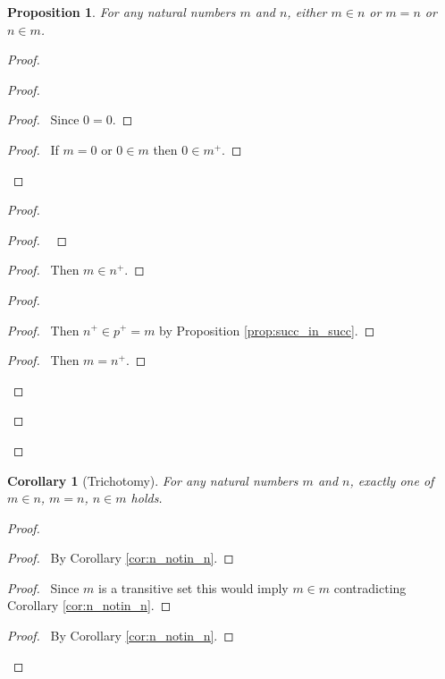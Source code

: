 \documentclass{report}
\let\qed\relax
\newtheorem{prop}[ax]{Proposition}
\newtheorem{cor}{Corollary}[ax]
\theoremstyle{definition}
\begin{document}
\begin{prop}
For any natural numbers $m$ and $n$, either $m \in n$ or $m = n$ or $n \in m$.
\end{prop}

\begin{proof}
\pf
{}
\begin{proof}
	\begin{proof}
		\pf\ Since $0=0$.
	\end{proof}
	\begin{proof}
		\pf\ If $m = 0$ or $0 \in m$ then $0 \in m^+$.
	\end{proof}
\end{proof}
\begin{proof}
	\begin{proof}
		\pf\ 
	\end{proof}
	\begin{proof}
		\pf\ Then $m \in n^+$.
	\end{proof}
	\begin{proof}
		\begin{proof}
			\pf\ Then $n^+ \in p^+ = m$ by Proposition \ref{prop:succ_in_succ}.
		\end{proof}
		\begin{proof}
			\pf\ Then $m = n^+$.
		\end{proof}
	\end{proof}
\end{proof}
\qed
\end{proof}

\begin{cor}[Trichotomy]
For any natural numbers $m$ and $n$, exactly one of $m \in n$, $m = n$, $n \in m$ holds.
\end{cor}

\begin{proof}
\pf
{}
\begin{proof}
	\pf\ By Corollary \ref{cor:n_notin_n}.
\end{proof}
\begin{proof}
	\pf\ Since $m$ is a transitive set this would imply $m \in m$ contradicting Corollary \ref{cor:n_notin_n}.
\end{proof}
\begin{proof}
	\pf\ By Corollary \ref{cor:n_notin_n}.
\end{proof}
\qed
\end{proof}
\end{document}
